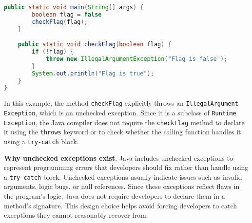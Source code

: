 \begin{itemize}
\begin{lstlisting}[language=java]
    public static void main(String[] args) {
        boolean flag = false
        checkFlag(flag);
    }

    public static void checkFlag(boolean flag) {
        if (!flag) {
            throw new IllegalArgumentException("Flag is false");
        }
        System.out.println("Flag is true");
    }
}
    \end{lstlisting}
    In this example, the method \texttt{checkFlag} explicitly throws an \texttt{IllegalArgument\\Exception},
    which is an unchecked exception. Since it is a subclass of \texttt{Runtime\\Exception}, the Java compiler
    does not require the \texttt{checkFlag} method to declare it using the \texttt{throws} keyword or
    to check whether the calling function handles it using a \texttt{try-catch} block.
\end{itemize}

\textbf{Why unchecked exceptions exist}. Java includes unchecked exceptions to represent programming errors that developers should fix rather than handle using a \texttt{try-catch} block. Unchecked exceptions usually indicate issues such as invalid arguments, logic bugs, or null references. Since these exceptions reflect flaws in the program's logic, Java does not require developers to declare them in a method’s signature. This design choice helps avoid forcing developers to catch exceptions they cannot reasonably recover from.

